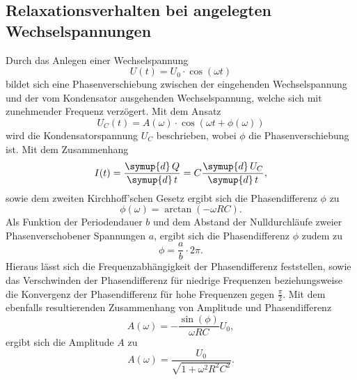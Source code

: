 \subsection{Relaxationsverhalten bei angelegten Wechselspannungen}
    Durch das Anlegen einer Wechselspannung 
    \begin{equation}
        \label{eqn:Wechselspannung}
        U(t) = U_0 \cdot \cos(\omega t)
    \end{equation}
    bildet sich eine Phasenverschiebung zwischen der eingehenden Wechselspannung und der vom Kondensator 
    ausgehenden Wechselspannung, welche sich mit zunehmender Frequenz verzögert. Mit dem Ansatz 
    \begin{equation}
        \label{eqn:Kondensatorspannung}
        U_C (t) = A(\omega) \cdot \cos(\omega t + \phi(\omega))
    \end{equation}
    wird die Kondensatorspannung $U_C$ beschrieben, wobei $\phi$ die Phasenverschiebung ist.
    Mit dem Zusammenhang
    \begin{equation}
        \label{eqn:stromstaerke}
        I(t) = \frac{\symup{d} \, Q} {\symup{d} \, t} = C \frac{\symup{d} \, U_C} {\symup{d} \, t},
    \end{equation}
    sowie dem zweiten Kirchhoff'schen Gesetz ergibt sich die Phasendifferenz $\phi$ zu 
    \begin{equation}
        \label{eqn:phasendifferenz}
        \phi(\omega) = \arctan (-\omega R C).
    \end{equation}
    Als Funktion der Periodendauer $b$ und dem Abstand der Nulldurchläufe zweier Phasenverschobener Spannungen $a$, ergibt sich die Phasendifferenz $\phi$
    zudem zu
    \begin{equation}
        \label{eqn:phasenmessung}
        \phi = \frac {a}{b} \cdot 2 \pi.
    \end{equation}
    Hieraus lässt sich die Frequenzabhängigkeit der Phasendifferenz feststellen, sowie das Verschwinden der Phasendifferenz für niedrige 
    Frequenzen beziehungsweise die Konvergenz der Phasendifferenz für hohe Frequenzen gegen $\frac{\pi}{2}$.
    Mit dem ebenfalls resultierenden Zusammenhang von Amplitude und Phasendifferenz
    \begin{equation}
        \label{eqn:zusammenhang}
        A(\omega) = - \frac {\sin(\phi)}{\omega R C} U_0,
    \end{equation}
    ergibt sich die Amplitude $A$ zu
    \begin{equation}
    \label{eqn:amplitude}
    A(\omega) = \frac{U_0}{\sqrt{1 + \omega^2 R^2 C^2}}.
    \end{equation}

